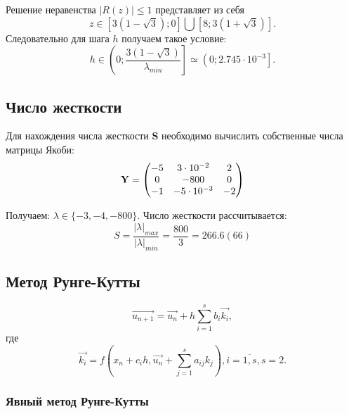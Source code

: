 \documentclass[12pt,a4paper]{article}
\begin{document}
Решение неравенства $\left| R(z) \right| \le 1$ представляет из себя 
$$ z \in \left[3(1-\sqrt{3}); 0 \right] \bigcup \left[8;3(1+\sqrt{3}) \right]. $$
Следовательно для шага $h$ получаем такое условие: 
$$ h \in \left(0; \frac{3(1-\sqrt{3})}{\lambda_{min}}\right] \simeq \left(0; 2.745 \cdot 10^{-3} \right]. $$


\subsection{Число жесткости} %
\label{sub:stiffness}

Для нахождения числа жесткости {\bf S} необходимо вычислить собственные числа матрицы Якоби: \\
\begin{equation*}
	{\bf Y} = 
	\begin{pmatrix}
	-5 & 3\cdot10^{-2} & 2 \\
	0 & -800 & 0 \\
	-1 & -5\cdot10^{-3} & -2
	\end{pmatrix}
\end{equation*} \par

Получаем: ${\lambda} {\in} \{-3, -4, -800\} $.
Число жесткости рассчитывается:
\begin{equation}
	S = \dfrac{|\lambda|_{max}}{|\lambda|_{min}} = \dfrac{800}{3} = 266.6(66)
\end{equation} \par


\subsection{Метод Рунге-Кутты} %
\label{sub:runge}

\begin{equation}
	\overrightarrow{u_{n+1}} = \overrightarrow{u_n} + h \sum_{i=1}^s b_i \overrightarrow{k_i},
\end{equation}
где
\begin{equation}
	\overrightarrow{k_i} = f\left(x_n + c_ih, \overrightarrow{u_n} + \sum_{j=1}^s a_{ij}k_j\right), i = \overline{1, s}, s = 2.
\end{equation}

\subsubsection{Явный метод Рунге-Кутты}
\label{ssub:explicit-runge}
\end{document}
